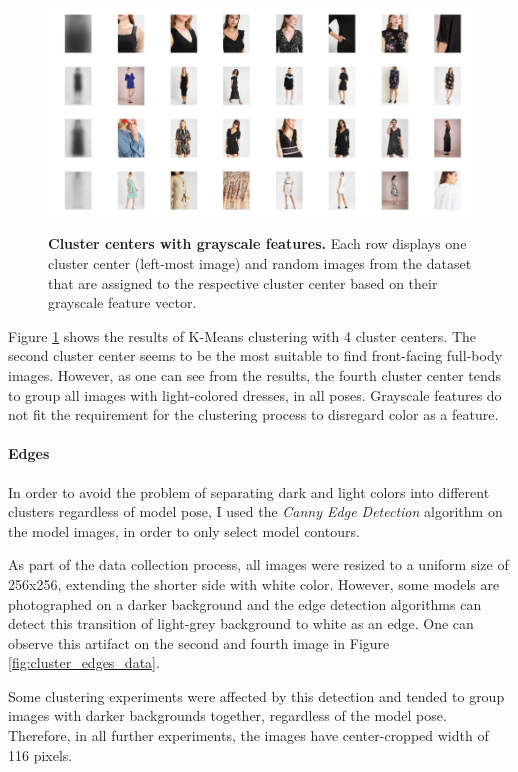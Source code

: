 \documentclass{article}
\begin{document}
\begin{figure}[h]
\centering
{\includegraphics[width=\linewidth]{clustering/grayscale}}
\caption{\label{fig:cluster_gray} \textbf{Cluster centers with grayscale features.} Each row displays one cluster center (left-most image) and random images from the dataset that are assigned to the respective cluster center based on their grayscale feature vector.}
\end{figure}

Figure \ref{fig:cluster_gray} shows the results of K-Means clustering with 4 cluster centers. The second cluster center seems to be the most suitable to find front-facing full-body images. However, as one can see from the results, the fourth cluster center tends to group all images with light-colored dresses, in all poses. Grayscale features do not fit the requirement for the clustering process to disregard color as a feature.


\paragraph{Edges}
In order to avoid the problem of separating dark and light colors into different clusters regardless of model pose, I used the \textit{Canny Edge Detection} algorithm on the model images, in order to only select model contours.

As part of the data collection process, all images were resized to a uniform size of 256x256, extending the shorter side with white color. However, some models are photographed on a darker background and the edge detection algorithms can detect this transition of light-grey background to white as an edge. One can observe this artifact on the second and fourth image in Figure \ref{fig:cluster_edges_data}.

Some clustering experiments were affected by this detection and tended to group images with darker backgrounds together, regardless of the model pose. Therefore, in all further experiments, the images have center-cropped width of 116 pixels.
\end{document}
